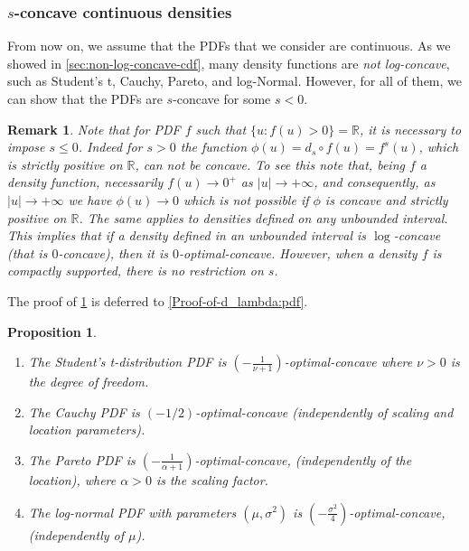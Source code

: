 \documentclass{article} %
\newtheorem{proposition}[theorem]{Proposition}
\newtheorem{remark}[theorem]{Remark}
\begin{document}
\subsubsection{$s$-concave continuous densities}
From now on, we assume that the PDFs that we consider are continuous. As we showed in \cref{sec:non-log-concave-cdf}, many density functions are \textit{not log-concave}, such as Student's t, Cauchy, Pareto, and log-Normal. However, for all of them, we can show that the PDFs are $s$-concave for some $s<0$.

\begin{remark}\label{remark:lambda<0_for_densities}
Note that for PDF $f$ such that $\{u:f(u)>0\} = \mathbb{R}$, it is necessary to impose $s\leq0$. Indeed for $s>0$ the function $\phi(u) = d_{s} \circ f (u) = f^{s}(u)$, which is strictly positive on $\mathbb{R}$, can not be concave. To see this note that, being $f$ a density function, necessarily $f(u) \rightarrow 0^+$ as $|u|\rightarrow +\infty$, and consequently, as $|u|\rightarrow +\infty$ we have $\phi(u)\rightarrow 0$ which is not possible if $\phi$ is concave and strictly positive on $\mathbb{R}$. The same applies to densities defined on any unbounded interval. This implies that if a density defined in an unbounded interval is $\log$-concave (that is $0$-concave), then it is $0$-optimal-concave. However, when a density $f$ is compactly supported, there is no restriction on $s$.
\end{remark}

The proof of \cref{d_lambda:pdf} is deferred to \cref{Proof-of-d_lambda:pdf}.

\begin{proposition}\label{d_lambda:pdf}
\begin{enumerate}
\item The Student's t-distribution PDF is $\left(- \frac{1}{\nu +1}\right)$-optimal-concave where $\nu>0$ is the degree of freedom. 
\item The Cauchy PDF is $\left(-1/2\right)$-optimal-concave (independently of scaling and location parameters).
\item The Pareto PDF is $\left(-\frac{1}{\alpha +1}\right)$-optimal-concave, (independently of the location), where $\alpha>0$ is the scaling factor.
\item The log-normal PDF with parameters $(\mu, \sigma^2)$ is $\left( -\frac{\sigma^2}{4}\right)$-optimal-concave, (independently of $\mu$).
\end{enumerate}    
\end{proposition}
 
\end{document}
